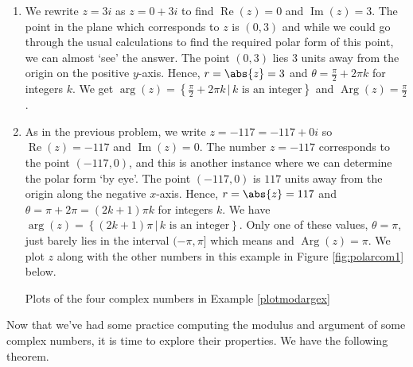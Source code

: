 {\begin{enumerate}
\item    We rewrite $z = 3i$ as $z = 0+3i$ to find $\operatorname{Re}(z) = 0$ and $\operatorname{Im}(z) = 3$.  The point in the plane which corresponds to $z$ is $(0,3)$ and while we could go through the usual calculations to find the required polar form of this point, we can almost `see' the answer.  The point  $(0,3)$ lies $3$ units away from the origin on the positive $y$-axis.  Hence, $r=\abs{z}=3$ and $\theta = \frac{\pi}{2} + 2\pi k$ for integers $k$. We get $\operatorname{arg}(z) = \left\{ \frac{\pi}{2} + 2\pi k \, | \, \text{$k$ is an integer} \right\}$ and $\operatorname{Arg}(z) = \frac{\pi}{2}$. 

\item As in the previous problem, we write $z = -117 = -117 + 0i$ so $\operatorname{Re}(z) = -117$ and $\operatorname{Im}(z) = 0$. The number $z = -117$ corresponds to the point $(-117,0)$, and this is another instance where  we can determine the polar form `by eye'.  The point $(-117,0)$ is $117$ units away from the origin along the negative $x$-axis.  Hence, $r=\abs{z}=117$ and $\theta = \pi + 2\pi  = (2k+1)\pi k$ for integers $k$. We have  $\operatorname{arg}(z) = \left\{ (2k+1)\pi \, | \, k \text{ is an  integer} \right\}$.  Only one of these values, $\theta = \pi$, just barely lies in the interval $(-\pi, \pi]$ which means and $\operatorname{Arg}(z) =\pi$. We plot $z$ along with the other numbers in this example in Figure \ref{fig:polarcom1} below.

\medskip

\noindent\begin{minipage}{\textwidth}
\begin{center}
\end{center}
\captionsetup{type=figure}
\caption{Plots of the four complex numbers in Example \ref{plotmodargex}}\label{fig:polarcom1}
\end{minipage}

\end{enumerate}
}

\medskip

Now that we've had some practice computing the modulus and argument of some complex numbers, it is time to explore their properties.  We have the following theorem.


